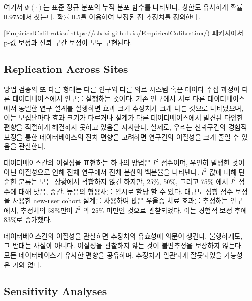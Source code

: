\documentclass[11pt]{book}
\theoremstyle{definition}
\theoremstyle{definition}
\theoremstyle{definition}
\theoremstyle{remark}
\let\BeginKnitrBlock\begin \let\EndKnitrBlock\end
\begin{document}
여기서 \(\Phi(\cdot)\)는 표준 정규 분포의 누적 분포 함수를 나타낸다.
상한도 유사하게 확률 0.975에서 찾는다. 확률 0.5를 이용하여 보정된 점
추정치를 정의한다.

{[}EmpiricalCalibration{]}\url{https://ohdsi.github.io/EmpiricalCalibration/})
패키지에서 p-값 보정과 신뢰 구간 보정이 모두 구현된다.

\subsection{Replication Across Sites}\label{replication-across-sites}


방법 검증의 또 다른 형태는 다른 인구와 다른 의료 시스템 혹은 데이터 수집
과정이 다른 데이터베이스에서 연구를 실행하는 것이다. 기존 연구에서 서로
다른 데이터베이스에서 동일한 연구 설계를 실행하면 효과 크기 추정치가
크게 다른 것으로 나타났으며, \citep{madigan_2013} 이는 모집단마다 효과
크기가 다르거나 설계가 다른 데이터베이스에서 발견된 다양한 편향을
적절하게 해결하지 못하고 있음을 시사한다. 실제로, 우리는 신뢰구간의
경험적 보정을 통한 데이터베이스의 잔차 편향을 고려하면 연구간의 이질성을
크게 줄일 수 있음을 관찰한다. \citep{schuemie_2018}

데이터베이스간의 이질성을 표현하는 하나의 방법은 \(I^2\) 점수이며,
우연히 발생한 것이 아닌 이질성으로 인해 전체 연구에서 전체 분산의
백분율을 나타낸다. \citep{higgins_2003} \(I^2\) 값에 대해 단순한 분류는
모든 상황에서 적합하지 않긴 하지만, 25\%, 50\%, 그리고 75\% 에서 \(I^2\)
점수에 대해 낮음, 중간, 높음의 형용사를 임시로 할당 할 수 있다. 대규모
성향 점수 보정을 사용한 new-user cohort 설계를 사용하여 많은 우울증 치료
효과를 추정하는 연구에서, \citep{schuemie_2018b} 추정치의 58\%만이
\(I^2\) 의 25\% 미만인 것으로 관찰되었다. 이는 경험적 보정 후에 83\%로
증가했다.

\BeginKnitrBlock{rmdimportant}
데이터베이스간의 이질성을 관찰하면 추정치의 유효성에 의문이 생긴다.
불행하게도, 그 반대는 사실이 아니다. 이질성을 관찰하지 않는 것이
불편추정을 보장하지 않는다. 모든 데이터베이스가 유사한 편향을 공유하며,
추정치가 일관되게 잘못되었을 가능성은 거의 없다.
\EndKnitrBlock{rmdimportant}

\subsection{Sensitivity Analyses}\label{sensitivity-analyses}

\end{document}
